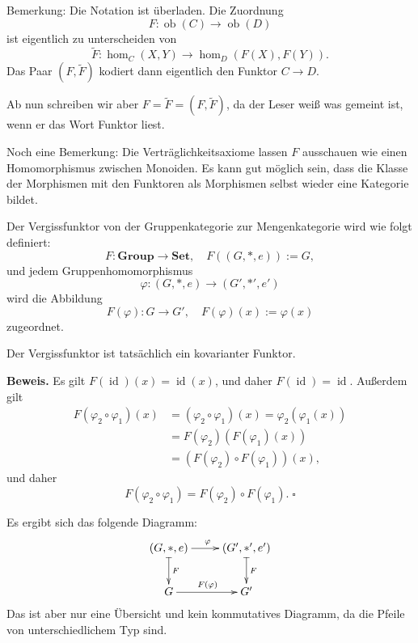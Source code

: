 \documentclass[9pt]{beamer}
\newcommand{\id}{\operatorname{id}}
\newcommand{\ob}{\operatorname{ob}}
\newcommand{\strong}[1]{\textsf{\textbf{#1}}}
\renewcommand{\qedsymbol}{\ensuremath{\square}}
\begin{document}
\begin{frame}
Bemerkung: Die Notation ist überladen. Die Zuordnung
\[F\colon\ob(C)\to\ob(D)\]
ist eigentlich zu unterscheiden von
\[\tilde F\colon\hom_C(X,Y)\to\hom_D(F(X),F(Y)).\]
Das Paar $(F,\tilde F)$ kodiert dann eigentlich den Funktor $C\to D$.

\vspace{1em}
Ab nun schreiben wir aber $F=\tilde F=(F,\tilde F)$, da der Leser
weiß was gemeint ist, wenn er das Wort Funktor liest.
\end{frame}

\begin{frame}
Noch eine Bemerkung: Die Verträglichkeitsaxiome lassen $F$ ausschauen wie einen
Homomorphismus zwischen Monoiden. Es kann gut möglich
sein, dass die Klasse der Morphismen mit den Funktoren als
Morphismen selbst wieder eine Kategorie bildet.
\end{frame}


\begin{frame}
Der Vergissfunktor von der Gruppenkategorie zur Mengenkategorie wird
wie folgt definiert:
\[F\colon\mathbf{Group}\to\mathbf{Set},\quad F((G,*,e)):=G,\]
und jedem Gruppenhomomorphismus
\[\varphi\colon (G,*,e)\to (G',*',e')\]
wird die Abbildung
\[F(\varphi)\colon G\to G',\quad F(\varphi)(x):=\varphi(x)\]
zugeordnet.
\end{frame}

\begin{frame}
Der Vergissfunktor ist tatsächlich ein kovarianter Funktor.

\vspace{1em}
\strong{Beweis.}
Es gilt $F(\id)(x)=\id(x)$, und daher $F(\id)=\id$. Außerdem gilt
\begin{align*}
F(\varphi_2\circ\varphi_1)(x) &= (\varphi_2\circ\varphi_1)(x)
= \varphi_2(\varphi_1(x))\\
&= F(\varphi_2)(F(\varphi_1)(x))\\
&= (F(\varphi_2)\circ F(\varphi_1))(x),
\end{align*}
und daher
\[F(\varphi_2\circ\varphi_1) = F(\varphi_2)\circ F(\varphi_1).\;\qedsymbol\]
\end{frame}

\begin{frame}
Es ergibt sich das folgende Diagramm:
\[\xymatrix{(G,*,e) \ar[r]^\varphi \ar@{|->}[d]^F & \ar@{|->}[d]^F (G',*',e')\\
G \ar[r]^{F(\varphi)} & G'}
\]
Das ist aber nur eine Übersicht und kein kommutatives Diagramm, da
die Pfeile von unterschiedlichem Typ sind.
\end{frame}
\end{document}
